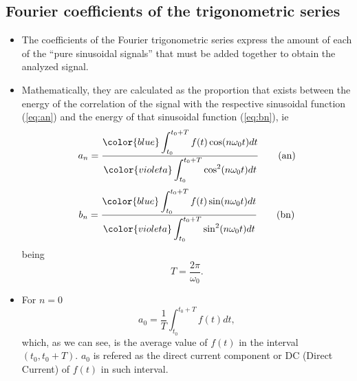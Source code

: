 \subsection{Fourier coefficients of the trigonometric series}
\begin{itemize}
\item The coefficients of the Fourier trigonometric series express the
  amount of each of the ``pure sinusoidal signals'' that must be added
  together to obtain the analyzed signal.
\item Mathematically, they are calculated as the proportion that
  exists between the energy of the correlation of the signal with the
  respective sinusoidal function (\ref{eq:an}) and the energy of that
  sinusoidal function (\ref{eq:bn}), ie
  \begin{equation}
    a_n=\frac{\displaystyle
      {\color{blue} \int_{t_0}^{t_0+T}f(t)\cos(n\omega_0t)dt}
    }{\displaystyle
      {\color{violeta} \int_{t_0}^{t_0+T}\cos^2(n\omega_0t)dt}
    } \tag{an}
    \label{eq:an}
  \end{equation}
  \begin{equation}
    b_n=\frac{\displaystyle
      {\color{blue} \int_{t_0}^{t_0+T}f(t)\sin(n\omega_0t)dt}
    }{\displaystyle
      {\color{violeta} \int_{t_0}^{t_0+T}\sin^2(n\omega_0t)dt}
    } \label{eq:bn} \tag{bn}
  \end{equation}
  being
  $$
  T=\frac{2\pi}{\omega_0}.
  $$
\item For $n=0$
  \begin{equation*}
    a_0 = \frac{1}{T}\int_{t_0}^{t_0+T} f(t)dt,
  \end{equation*}
  which, as we can see, is the average value of $f(t)$ in the interval
  $(t_0, t_0+T)$. $a_0$ is refered as the direct current component
  or DC (Direct Current) of $f(t)$ in such interval.


\end{itemize}
